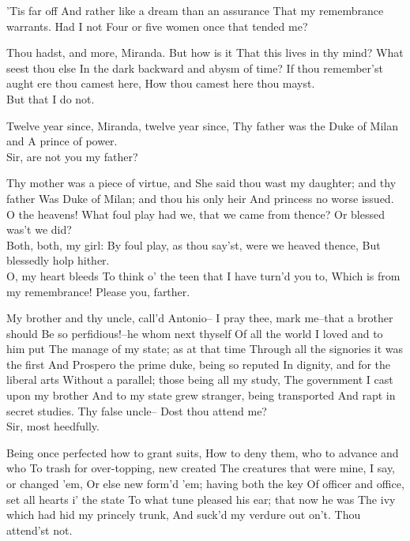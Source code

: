 \documentclass[11pt]{book}
\begin{document}
\2	'Tis far off
	And rather like a dream than an assurance
	That my remembrance warrants. Had I not
	Four or five women once that tended me?

\1	Thou hadst, and more, Miranda. But how is it
	That this lives in thy mind? What seest thou else
	In the dark backward and abysm of time?
	If thou remember'st aught ere thou camest here,
	How thou camest here thou mayst. \\

\2	But that I do not.

\1	Twelve year since, Miranda, twelve year since,
	Thy father was the Duke of Milan and
	A prince of power. \\

\2	                  Sir, are not you my father?

\1	Thy mother was a piece of virtue, and
	She said thou wast my daughter; and thy father
	Was Duke of Milan; and thou his only heir
	And princess no worse issued. \\

\2	O the heavens!
	What foul play had we, that we came from thence?
	Or blessed was't we did? \\

\1	Both, both, my girl:
	By foul play, as thou say'st, were we heaved thence,
	But blessedly holp hither. \\

\2	O, my heart bleeds
	To think o' the teen that I have turn'd you to,
	Which is from my remembrance! Please you, farther.

\1	My brother and thy uncle, call'd Antonio--
	I pray thee, mark me--that a brother should
	Be so perfidious!--he whom next thyself
	Of all the world I loved and to him put
	The manage of my state; as at that time
	Through all the signories it was the first
	And Prospero the prime duke, being so reputed
	In dignity, and for the liberal arts
	Without a parallel; those being all my study,
	The government I cast upon my brother
	And to my state grew stranger, being transported
	And rapt in secret studies. Thy false uncle--
	Dost thou attend me? \\

\2	Sir, most heedfully.

\1	Being once perfected how to grant suits,
	How to deny them, who to advance and who
	To trash for over-topping, new created
	The creatures that were mine, I say, or changed 'em,
	Or else new form'd 'em; having both the key
	Of officer and office, set all hearts i' the state
	To what tune pleased his ear; that now he was
	The ivy which had hid my princely trunk,
	And suck'd my verdure out on't. Thou attend'st not.
\end{document}
